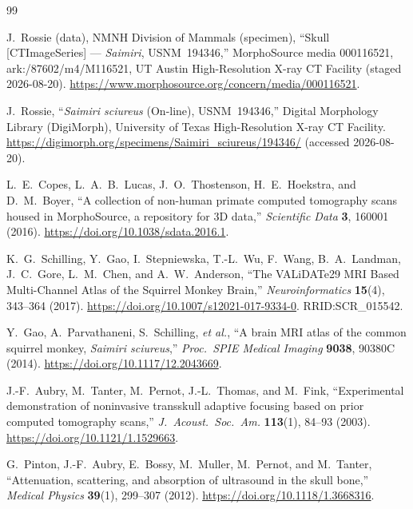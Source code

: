 \documentclass{compactarticle}
\begin{document}
\begin{thebibliography}{99}

 J.~Rossie (data), NMNH Division of
  Mammals (specimen),
  ``Skull [CTImageSeries] --- \emph{Saimiri}, USNM~194346,''
  MorphoSource media 000116521, ark:/87602/m4/M116521, UT Austin
  High-Resolution X-ray CT Facility (staged 2026-08-20).
  \url{https://www.morphosource.org/concern/media/000116521}.

 J.~Rossie,
  ``\emph{Saimiri sciureus} (On-line), USNM~194346,''
  Digital Morphology Library (DigiMorph), University of Texas
  High-Resolution X-ray CT Facility.
  \url{https://digimorph.org/specimens/Saimiri_sciureus/194346/}
  (accessed 2026-08-20).

 L.~E.~Copes, L.~A.~B.~Lucas, J.~O.~Thostenson,
  H.~E.~Hoekstra, and D.~M.~Boyer,
  ``A collection of non-human primate computed tomography scans housed
  in MorphoSource, a repository for 3D data,''
  \emph{Scientific Data} {\bf 3}, 160001 (2016).
  \url{https://doi.org/10.1038/sdata.2016.1}.

 K.~G.~Schilling, Y.~Gao, I.~Stepniewska,
  T.-L.~Wu, F.~Wang, B.~A.~Landman, J.~C.~Gore, L.~M.~Chen, and
  A.~W.~Anderson,
  ``The VALiDATe29 MRI Based Multi-Channel Atlas of the Squirrel
  Monkey Brain,''
  \emph{Neuroinformatics} {\bf 15}(4), 343--364 (2017).
  \url{https://doi.org/10.1007/s12021-017-9334-0}. RRID:SCR\_015542.

 Y.~Gao, A.~Parvathaneni, S.~Schilling,
  \emph{et al.},
  ``A brain MRI atlas of the common squirrel monkey,
  \emph{Saimiri sciureus},''
  \emph{Proc.\ SPIE Medical Imaging} {\bf 9038}, 90380C (2014).
  \url{https://doi.org/10.1117/12.2043669}.

 J.-F.~Aubry, M.~Tanter, M.~Pernot,
  J.-L.~Thomas, and M.~Fink,
  ``Experimental demonstration of noninvasive transskull adaptive
  focusing based on prior computed tomography scans,''
  \emph{J.\ Acoust.\ Soc.\ Am.} {\bf 113}(1), 84--93 (2003).
  \url{https://doi.org/10.1121/1.1529663}.

 G.~Pinton, J.-F.~Aubry, E.~Bossy, M.~Muller,
  M.~Pernot, and M.~Tanter,
  ``Attenuation, scattering, and absorption of ultrasound in the skull
  bone,''
  \emph{Medical Physics} {\bf 39}(1), 299--307 (2012).
  \url{https://doi.org/10.1118/1.3668316}.


\end{thebibliography}
\end{document}
